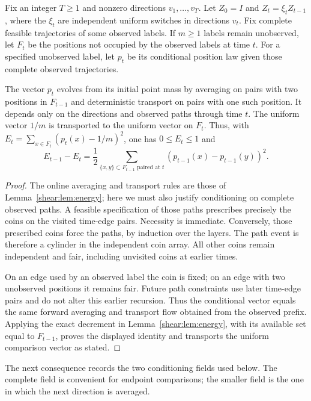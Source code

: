 \begin{lemma}
\label{frames:holes}
Fix an integer $T\ge1$ and nonzero directions $v_1,\ldots,v_T$. Let $Z_0=I$ and
$Z_t=\xi_tZ_{t-1}$, where the $\xi_t$ are independent uniform switches
in directions $v_t$. Fix complete feasible trajectories of some observed
labels. If $m\ge1$ labels remain unobserved, let $F_t$ be the positions
not occupied by the observed labels at time $t$. For a specified
unobserved label, let $p_t$ be its conditional position law given those
complete observed trajectories.

The vector $p_t$ evolves from its initial point mass by averaging on
pairs with two positions in $F_{t-1}$ and deterministic transport on
pairs with one such position. It depends only on the directions and
observed paths through time $t$. The uniform vector $1/m$ is transported
to the uniform vector on $F_t$. Thus, with
$E_t=\sum_{x\in F_t}(p_t(x)-1/m)^2$, one has $0\le E_t\le1$ and
\begin{equation}
 E_{t-1}-E_t=\frac12\sum_{\{x,y\}\subset F_{t-1}\text{ paired at }t}
                    (p_{t-1}(x)-p_{t-1}(y))^2.
 \label{frames:hole-loss}
\end{equation}
\end{lemma}

\begin{proof}
The online averaging and transport rules are those of
Lemma~\ref{shear:lem:energy}; here we must also justify conditioning
on complete observed paths. A feasible specification of those paths
prescribes precisely the coins on the visited time-edge pairs.
Necessity is immediate. Conversely, those prescribed coins force the
paths, by induction over the layers. The path event is therefore a
cylinder in the independent coin array. All other coins remain
independent and fair, including unvisited coins at earlier times.

On an edge used by an observed label the coin is fixed; on an edge
with two unobserved positions it remains fair. Future path constraints
use later time-edge pairs and do not alter this earlier recursion.
Thus the conditional vector equals the same forward averaging and
transport flow obtained from the observed prefix. Applying the
exact decrement in Lemma~\ref{shear:lem:energy}, with its available
set equal to $F_{t-1}$, proves the displayed identity and transports
the uniform comparison vector as stated.
\end{proof}

The next consequence records the two conditioning fields used below.
The complete field is convenient for endpoint comparisons; the smaller
field is the one in which the next direction is averaged.

